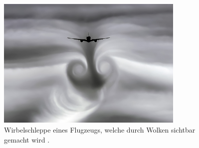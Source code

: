 \begin{figure}
\centering
\includegraphics[width=0.8\textwidth]{papers/wirbelringe/fig/Wirbelschleppe.jpeg}
\caption{Wirbelschleppe eines Flugzeugs, welche durch Wolken sichtbar gemacht wird \cite{Wirbelringe:Wirbelschleppe_in_Wolken}. \label{Wirbelringe:fig:Wirbelschleppe_in_wolken}}
\end{figure}